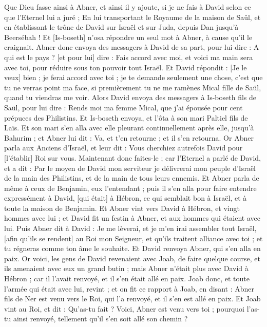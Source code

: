 \begin{multicols}{2}
Que Dieu fasse ainsi à Abner, et ainsi il y ajoute, si je ne fais à David selon ce que l'Eternel lui a juré ;
En lui transportant le Royaume de la maison de Saül, et en établissant le trône de David sur Israël et sur Juda, depuis Dan jusqu'à Beersébah !
Et [Is-boseth] n'osa répondre un seul mot à Abner, à cause qu'il le craignait.
Abner donc envoya des messagers à David de sa part, pour lui dire : A qui est le pays ? [et pour lui] dire : Fais accord avec moi, et voici ma main sera avec toi, pour réduire sous ton pouvoir tout Israël.
Et David répondit : [Je le veux] bien ; je ferai accord avec toi ; je te demande seulement une chose, c'est que tu ne verras point ma face, si premièrement tu ne me ramènes Mical fille de Saül, quand tu viendras me voir.
Alors David envoya des messagers à Is-boseth fils de Saül, pour lui dire : Rends moi ma femme Mical, que j'ai épousée pour cent prépuces des Philistins.
Et Is-boseth envoya, et l'ôta à son mari Paltiel fils de Laïs.
Et son mari s'en alla avec elle pleurant continuellement après elle, jusqu'à Bahurim ; et Abner lui dit : Va, et t'en retourne ; et il s'en retourna.
Or Abner parla aux Anciens d'Israël, et leur dit : Vous cherchiez autrefois David pour [l'établir] Roi sur vous.
Maintenant donc faites-le ; car l'Eternel a parlé de David, et a dit : Par le moyen de David mon serviteur je délivrerai mon peuple d'Israël de la main des Philistins, et de la main de tous leurs ennemis.
Et Abner parla de même à ceux de Benjamin, eux l'entendant ; puis il s'en alla pour faire entendre expressément à David, [qui était] à Hébron, ce qui semblait bon à Israël, et à toute la maison de Benjamin.
Et Abner vint vers David à Hébron, et vingt hommes avec lui ; et David fit un festin à Abner, et aux hommes qui étaient avec lui.
Puis Abner dit à David : Je me lèverai, et je m'en irai assembler tout Israël, [afin qu'ils se rendent] au Roi mon Seigneur, et qu'ils traitent alliance avec toi ; et tu régneras comme ton âme le souhaite. Et David renvoya Abner, qui s'en alla en paix.
Or voici, les gens de David revenaient avec Joab, de faire quelque course, et ils amenaient avec eux un grand butin ; mais Abner n'était plus avec David à Hébron ; car il l'avait renvoyé, et il s'en était allé en paix.
Joab donc, et toute l'armée qui était avec lui, revint ; et on fit ce rapport à Joab, en disant : Abner fils de Ner est venu vers le Roi, qui l'a renvoyé, et il s'en est allé en paix.
Et Joab vint au Roi, et dit : Qu'as-tu fait ? Voici, Abner est venu vers toi ; pourquoi l'as-tu ainsi renvoyé, tellement qu'il s'en soit allé son chemin ?

\end{multicols}
